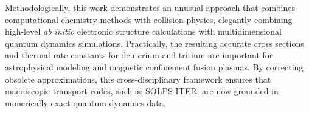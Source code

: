 Methodologically, this work demonstrates an unusual approach that combines computational chemistry methods with collision physics, elegantly combining high-level \textit{ab initio} electronic structure calculations with multidimensional quantum dynamics simulations. Practically, the resulting accurate cross sections and thermal rate constants for deuterium and tritium are important for astrophysical modeling and magnetic confinement fusion plasmas. By correcting obsolete approximations, this cross-disciplinary framework ensures that macroscopic transport codes, such as SOLPS-ITER, are now grounded in numerically exact quantum dynamics data.\supercite{10.1088/1741-4326/adcad0}
